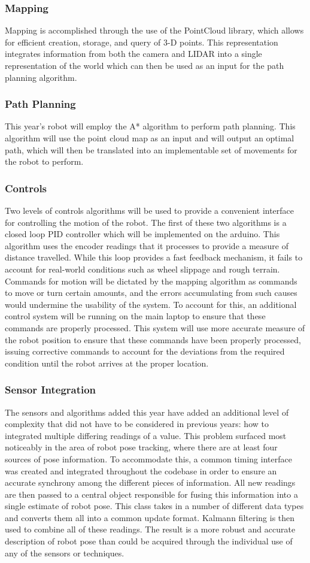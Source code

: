 \subsubsection{Mapping}
Mapping is accomplished through the use of the PointCloud library, which allows for efficient creation, storage, and query of 3-D points. This representation integrates information from both the camera and LIDAR into a single representation of the world which can then be used as an input for the path planning algorithm.
\subsubsection{Path Planning}
This year's robot will employ the A* algorithm to perform path planning. This algorithm will use the point cloud map as an input and will output an optimal path, which will then be translated into an implementable set of movements for the robot to perform.
\subsubsection{Controls}
Two levels of controls algorithms will be used to provide a convenient interface for controlling the motion of the robot. The first of these two algorithms is a closed loop PID controller which will be implemented on the arduino. This algorithm uses the encoder readings that it processes to provide a measure of distance travelled. While this loop provides a fast feedback mechanism, it fails to account for real-world conditions such as wheel slippage and rough terrain. Commands for motion will be dictated by the mapping algorithm as commands to move or turn certain amounts, and the errors accumulating from such causes would undermine the usability of the system. To account for this, an additional control system will be running on the main laptop to ensure that these commands are properly processed. This system will use more accurate measure of the robot position to ensure that these commands have been properly processed, issuing corrective commands to account for the deviations from the required condition until the robot arrives at the proper location.
\subsubsection{Sensor Integration}
The sensors and algorithms added this year have added an additional level of complexity that did not have to be considered in previous years: how to integrated multiple differing readings of a value. This problem surfaced most noticeably in the area of robot pose tracking, where there are at least four sources of pose information. To accommodate this, a common timing interface was created and integrated throughout the codebase in order to ensure an accurate synchrony among the different pieces of information. All new readings are then passed to a central object responsible for fusing this information into a single estimate of robot pose. This class takes in a number of different data types and converts them all into a common update format. Kalmann filtering is then used to combine all of these readings. The result is a more robust and accurate description of robot pose than could be acquired through the individual use of any of the sensors or techniques.